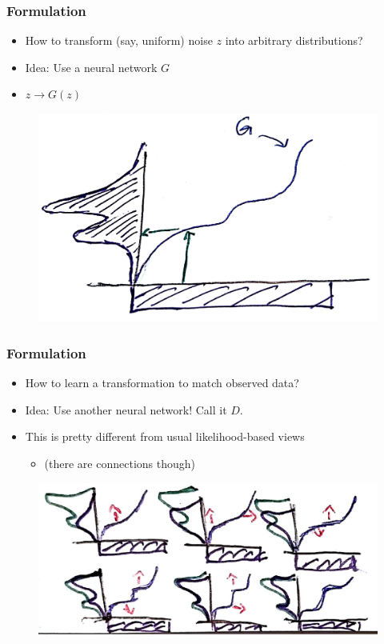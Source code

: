 \documentclass[10pt,mathserif]{beamer}
\begin{document}
\begin{frame}
  \frametitle{Formulation}
 \begin{itemize}
 \item How to transform (say, uniform) noise $z$ into arbitrary distributions?
 \item Idea: Use a neural network $G$
 \item $z \rightarrow G\left(z\right)$
 \end{itemize}
\begin{figure}[ht]
  \centering
  \includegraphics[width=0.7\paperwidth]{figure/sample_transformation}
  \caption{\label{fig:sample_transformation} }
\end{figure}
\end{frame}

\begin{frame}
  \frametitle{Formulation}
 \begin{itemize}
 \item How to learn a transformation to match observed data?
 \item Idea: Use another neural network! Call it $D$.
 \item This is pretty different from usual likelihood-based views
   \begin{itemize}
   \item (there are connections though)
   \end{itemize}
 \end{itemize}
\begin{figure}[ht]
  \centering
  \includegraphics[width=0.7\paperwidth]{figure/discriminator_transformation}
  \caption{\label{fig:discriminator_transformation} }
\end{figure}
\end{frame}
\end{document}
